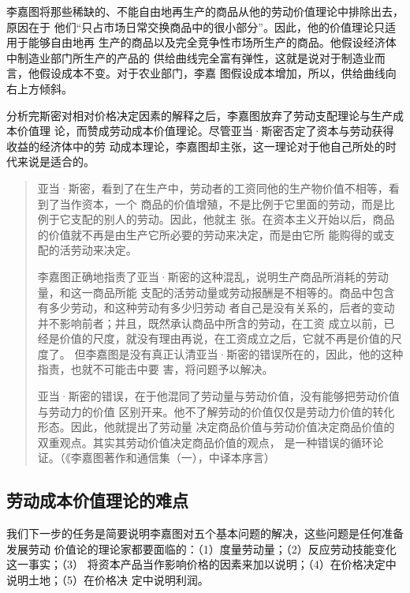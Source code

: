 李嘉图将那些稀缺的、不能自由地再生产的商品从他的劳动价值理论中排除出去，原因在于
他们“只占市场日常交换商品中的很小部分”。因此，他的价值理论只适用于能够自由地再
生产的商品以及完全竞争性市场所生产的商品。他假设经济体中制造业部门所生产的产品的
供给曲线完全富有弹性，这就是说对于制造业而言，他假设成本不变。对于农业部门，李嘉
图假设成本增加，所以，供给曲线向右上方倾斜。

分析完斯密对相对价格决定因素的解释之后，李嘉图放弃了劳动支配理论与生产成本价值理
论，而赞成劳动成本价值理论。尽管亚当·斯密否定了资本与劳动获得收益的经济体中的劳
动成本理论，李嘉图却主张，这一理论对于他自己所处的时代来说是适合的。

\begin{quotation}
  亚当·斯密，看到了在生产中，劳动者的工资同他的生产物价值不相等，看到了当作资本，一个
  商品的价值增殖，不是比例于它里面的劳动，而是比例于它支配的别人的劳动。因此，他就主
  张。在资本主义开始以后，商品的价值就不再是由生产它所必要的劳动来决定，而是由它所
  能购得的或支配的活劳动来决定。

  李嘉图正确地指责了亚当·斯密的这种混乱，说明生产商品所消耗的劳动量，和这一商品所能
  支配的活劳动量或劳动报酬是不相等的。商品中包含有多少劳动，和这种劳动有多少归劳动
  者自己是没有关系的，后者的变动并不影响前者；并且，既然承认商品中所含的劳动，在工资
  成立以前，已经是价值的尺度，就没有理由再说，在工资成立之后，它就不再是价值的尺度了。
  但李嘉图是没有真正认清亚当·斯密的错误所在的，因此，他的这种指责，也就不可能击中要
  害，将问题予以解决。

  亚当·斯密的错误，在于他混同了劳动量与劳动价值，没有能够把劳动价值与劳动力的价值
  区别开来。他不了解劳动的价值仅仅是劳动力价值的转化形态。因此，他就提出了劳动量
  决定商品价值与劳动价值决定商品价值的双重观点。其实其劳动价值决定商品价值的观点，
  是一种错误的循环论证。（《李嘉图著作和通信集（一），中译本序言）
\end{quotation}

\subsection{劳动成本价值理论的难点}

我们下一步的任务是简要说明李嘉图对五个基本问题的解决，这些问题是任何准备发展劳动
价值论的理论家都要面临的：（1）度量劳动量；（2）反应劳动技能变化这一事实；（3）
将资本产品当作影响价格的因素来加以说明；（4）在价格决定中说明土地；（5）在价格决
定中说明利润。

